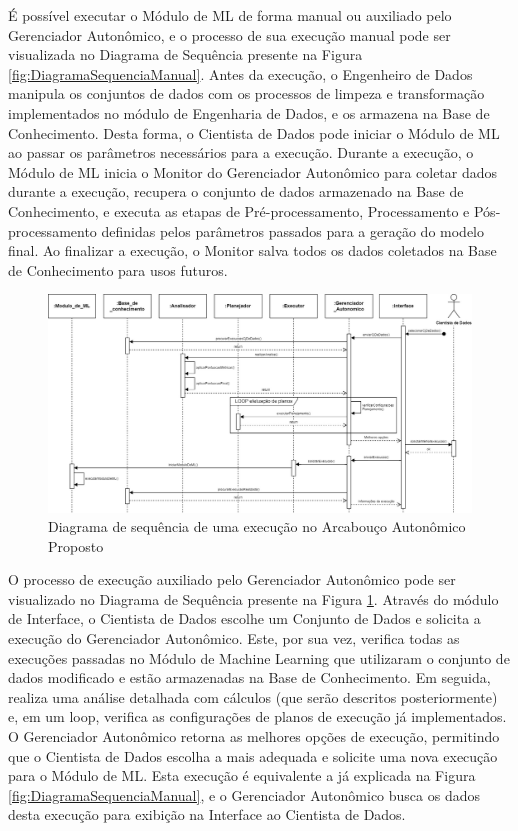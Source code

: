 \documentclass[Portugues,Final]{ic-tese-v3}
\begin{document}
É possível executar o Módulo de ML de forma manual ou auxiliado pelo Gerenciador Autonômico, e o processo de sua execução manual pode ser visualizada no Diagrama de Sequência presente na Figura \ref{fig:DiagramaSequenciaManual}. Antes da execução, o Engenheiro de Dados manipula os conjuntos de dados com os processos de limpeza e transformação implementados no módulo de Engenharia de Dados, e os armazena na Base de Conhecimento. Desta forma, o Cientista de Dados pode iniciar o Módulo de ML ao passar os parâmetros necessários para a execução. Durante a execução, o Módulo de ML inicia o Monitor do Gerenciador Autonômico para coletar dados durante a execução, recupera o conjunto de dados armazenado na Base de Conhecimento, e executa as etapas de Pré-processamento, Processamento e Pós-processamento definidas pelos parâmetros passados para a geração do modelo final. Ao finalizar a execução, o Monitor salva todos os dados coletados na Base de Conhecimento para usos futuros.

\begin{figure}
\clearpage
\includegraphics[scale=0.445]{images/Diagrama_Sequencia_Auto.jpg}
\caption {Diagrama de sequência de uma execução no Arcabouço Autonômico Proposto}
\label{fig:DiagramaSequenciaAuto}
\end{figure}

O processo de execução auxiliado pelo Gerenciador Autonômico pode ser visualizado no Diagrama de Sequência presente na Figura \ref{fig:DiagramaSequenciaAuto}. Através do módulo de Interface, o Cientista de Dados escolhe um Conjunto de Dados e solicita a execução do Gerenciador Autonômico. Este, por sua vez, verifica todas as execuções passadas no Módulo de Machine Learning que utilizaram o conjunto de dados modificado e estão armazenadas na Base de Conhecimento. Em seguida, realiza uma análise detalhada com cálculos (que serão descritos posteriormente) e, em um loop, verifica as configurações de planos de execução já implementados. O Gerenciador Autonômico retorna as melhores opções de execução, permitindo que o Cientista de Dados escolha a mais adequada e solicite uma nova execução para o Módulo de ML. Esta execução é equivalente a já explicada na Figura \ref{fig:DiagramaSequenciaManual}, e o Gerenciador Autonômico busca os dados desta execução para exibição na Interface ao Cientista de Dados.
\end{document}
